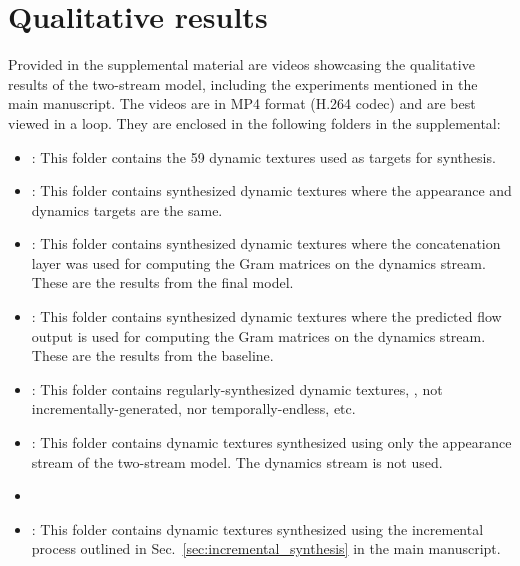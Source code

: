 \section{Qualitative results}
Provided in the supplemental material are videos showcasing the qualitative results of the two-stream model, including the experiments mentioned in the main manuscript. The videos are in MP4 format (H.264 codec) and are best viewed in a loop. They are enclosed in the following folders in the supplemental:
\begin{itemize}
	\item {}: This folder contains the 59 dynamic textures used as targets for synthesis.
	\item {}: This folder contains synthesized dynamic textures where the appearance and dynamics targets are the same. 
	\item {}: This folder contains synthesized dynamic textures where the concatenation layer was used for computing the Gram matrices on the dynamics stream. These are the results from the final model. 
	\item {}: This folder contains synthesized dynamic textures where the predicted flow output is used for computing the Gram matrices on the dynamics stream. These are the results from the baseline. 
	\item {}: This folder contains regularly-synthesized dynamic textures, \ie, not incrementally-generated, nor temporally-endless, etc.
	\item {}: This folder contains dynamic textures synthesized using only the appearance stream of the two-stream model. The dynamics stream is not used.
	\item {}
	\item {}: This folder contains dynamic textures synthesized using the incremental process outlined in Sec.\ \ref{sec:incremental_synthesis} in the main manuscript.

\end{itemize}
